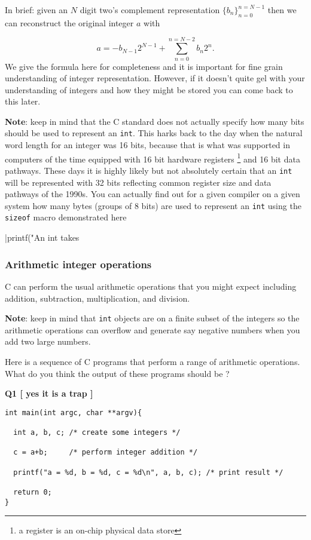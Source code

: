  In brief: given an $N$ digit two's complement representation $\{b_n\}_{n=0}^{n=N-1}$ then we can reconstruct the original integer $a$ with 
 
 \[
 a = -b_{N-1}2^{N-1} + \sum_{n=0}^{n=N-2} b_n 2^n.
 \]
 We give the formula here for completeness and it is important for fine grain understanding of integer representation. However, if it doesn't quite gel with your understanding of integers and how they might be stored you can come back to this later.
 
{\bf Note}: keep in mind that the C standard does not actually specify how many bits should be used to represent an \texttt{int}. This harks back to the day when the natural word length for an integer was 16 bits, because that is what was supported in computers of the time equipped with 16 bit hardware registers \footnote{a register is an on-chip physical data store} and 16 bit data pathways. These days it is highly likely but not absolutely certain that an \texttt{int} will be represented with 32 bits reflecting common register size and data pathways of the 1990s. You can actually find out for a given compiler on a given system how many bytes (groups of 8 bits) are used to represent an \texttt{int} using the \texttt{sizeof} macro demonstrated here

|printf("An int takes %

\subsubsection{Arithmetic integer operations}

C can perform the usual arithmetic operations that you might expect including addition, subtraction, multiplication, and division. 

{\bf Note}: keep in mind that \texttt{int} objects are on a finite subset of the integers so the arithmetic operations can overflow and generate say negative numbers when you add two large numbers.

Here is a sequence of C programs that perform a range of arithmetic operations. What do you think the output of these programs should be ?

{\bf Q1 [ yes it is a trap ]}
\begin{verbatim}
int main(int argc, char **argv){

  int a, b, c; /* create some integers */
  
  c = a+b;     /* perform integer addition */

  printf("a = %d, b = %d, c = %d\n", a, b, c); /* print result */
  
  return 0;
}
\end{verbatim}

